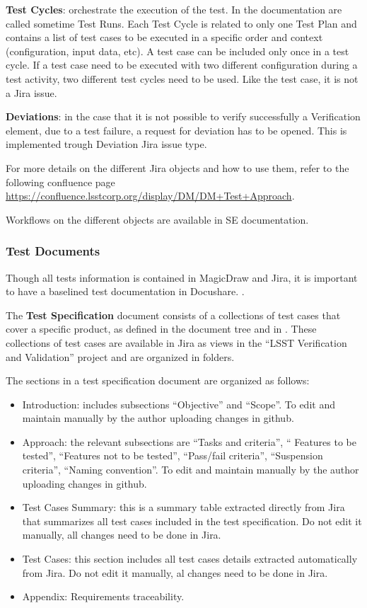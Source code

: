 {\bf Test Cycles}: orchestrate the execution of the test. In the documentation are called sometime Test Runs.
Each Test Cycle is related to only one Test Plan and contains a list of test cases to be executed in a specific order and context (configuration, input data, etc).
A test case can be included only once in a test cycle. If a test case need to be executed with two different configuration during a test activity, two different test cycles need to be used.
Like the test case, it is not a Jira issue.

{\bf Deviations}: in the case that it is not possible to verify successfully a Verification element, due to a test failure, a request for deviation has to be opened.
This is implemented trough Deviation Jira issue type.

For more details on the different Jira objects and how to use them, refer to the following confluence page
\url{https://confluence.lsstcorp.org/display/DM/DM+Test+Approach}.

Workflows on the different objects are available in SE documentation.


\subsubsection{Test Documents}

Though all tests information is contained in MagicDraw and Jira, it is important to have a  baselined test documentation in Docushare. .

The {\bf Test Specification} document consists of a collections of test cases that cover a specific \product{} product, as defined in the document tree and in .
These collections of test cases are available in Jira as views in the ``LSST Verification and Validation'' project and are organized in folders.

The sections in a test specification document are organized as follows:

\begin{itemize}
\item Introduction: includes subsections ``Objective'' and ``Scope''. To edit and maintain manually by the author uploading changes in github.
\item Approach: the relevant subsections are ``Tasks and criteria'', `` Features to be tested'', ``Features not to be tested'', ``Pass/fail criteria'', ``Suspension criteria'', ``Naming convention''. To edit and maintain manually by the author uploading changes in github.
\item Test Cases Summary: this is a summary table extracted directly from Jira that summarizes all test cases included in the test specification. Do not edit it manually, all changes need to be done in Jira.
\item Test Cases: this section includes all test cases details extracted automatically from Jira. Do not edit it manually, al changes need to be done in Jira.
\item Appendix: Requirements traceability.
\end{itemize}


